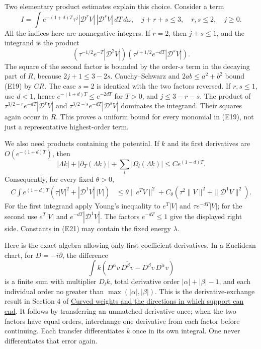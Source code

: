 \documentclass[
  11pt,
]{article}
\begin{document}
Two elementary product estimates explain this choice. Consider a term \[
 I=\int e^{-(1+d)T}\tau^j
              |\mathcal D^rV|\,|\mathcal D^sV|\,dT\,d\omega,
 \quad j+r+s\leq3,\quad r,s\leq2,\quad j\geq0.                 \tag{E19}
\] All the indices here are nonnegative integers. If \(r=2\), then
\(j+s\leq1\), and the integrand is the product \[
 \left(\tau^{-1/2}e^{-T}|\mathcal D^2V|\right)
 \left(\tau^{j+1/2}e^{-dT}|\mathcal D^sV|\right).
                                                                    \tag{E20}
\] The square of the second factor is bounded by the order-\(s\) term in
the decaying part of \(R\), because \(2j+1\leq3-2s\). Cauchy--Schwarz
and \(2ab\leq a^2+b^2\) bound (E19) by \(CR\). The case \(s=2\) is
identical with the two factors reversed. If \(r,s\leq1\), use \(d<1\),
hence \(e^{-(1+d)T}\leq e^{-2dT}\) for \(T>0\), and \(j\leq3-r-s\). The
product of \(\tau^{3/2-r}e^{-dT}|\mathcal D^rV|\) and
\(\tau^{3/2-s}e^{-dT}|\mathcal D^sV|\) dominates the integrand. Their
squares again occur in \(R\). This proves a uniform bound for every
monomial in (E19), not just a representative highest-order term.

We also need products containing the potential. If \(k\) and its first
derivatives are \(O(e^{-(1+d)T})\), then \[
 |\Lambda k|+|\partial_T(\Lambda k)|+
                   \sum_l|\Omega_l(\Lambda k)|
                       \leq C e^{(1-d)T}.                       \tag{E21}
\] Consequently, for every fixed \(\theta>0\), \[
\begin{split}
 C\int e^{(1-d)T}
       \left(\tau|V|^2+|\mathcal D^1V|\,|V|\right)
 &\leq \theta\|e^TV\|^2
       +C_\theta\left(\tau^2\|V\|^2+\|\mathcal D^1V\|^2\right).
\end{split}                                                       \tag{E22}
\] For the first integrand apply Young's inequality to \(e^T|V|\) and
\(\tau e^{-dT}|V|\); for the second use \(e^T|V|\) and
\(e^{-dT}|\mathcal D^1V|\). The factors \(e^{-dT}\leq1\) give the
displayed right side. Constants in (E21) may contain the fixed energy
\(\lambda\).

Here is the exact algebra allowing only first coefficient derivatives.
In a Euclidean chart, for \(D=-i\partial\), the difference \[
 \int k\left(D^\alpha v\,\overline{D^\beta v}
             -D^\beta v\,\overline{D^\alpha v}\right)
                                                                    \tag{E23}
\] is a finite sum with multiplier \(D_lk\), total derivative order
\(|\alpha|+|\beta|-1\), and each individual order no greater than
\(\max(|\alpha|,|\beta|)\). This is the derivative-exchange result in
Section 4 of \href{support-continuation.pdf}{Curved weights and the
directions in which support can end}. It follows by transferring an
unmatched derivative once; when the two factors have equal orders,
interchange one derivative from each factor before continuing. Each
transfer differentiates \(k\) once in its own integral. One never
differentiates that error again.
\end{document}
